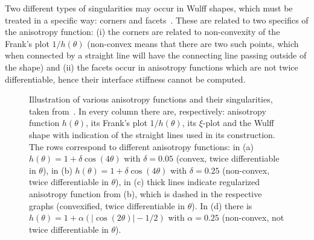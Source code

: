 Two different types of singularities may occur in Wulff shapes, which must be treated in a specific way: corners and facets~\cite{Kobayashi2001, Fleck2011}. These are related to two specifics of the anisotropy function: (i) the corners are related to non-convexity of the Frank's plot $1/h(\theta)$ (non-convex means that there are two such points, which when connected by a straight line will have the connecting line passing outside of the shape) and (ii) the facets occur in anisotropy functions which are not twice differentiable, hence their interface stiffness cannot be computed.
\begin{figure}
	\centering
	\caption[Various types of anisotropy functions in 2D]{Illustration of various anisotropy functions and their singularities, taken from~\cite{Kobayashi2001}. In every column there are, respectively: anisotropy function $h(\theta)$, its Frank's plot  $1/h(\theta)$, its $\xi$-plot and the Wulff shape with indication of the straight lines used in its construction. The rows correspond to different anisotropy functions: in (a) $h(\theta) = 1+\delta\cos(4\theta)$ with $\delta=0.05$ (convex, twice differentiable in $\theta$), in (b) $h(\theta) = 1+\delta\cos(4\theta)$ with $\delta=0.25$ (non-convex, twice differentiable in $\theta$), in (c) thick lines indicate regularized anisotropy function from (b), which is dashed in the respective graphs (convexified, twice differentiable in $\theta$). In (d) there is $h(\theta) = 1+\alpha(|\cos(2\theta)|-1/2)$ with $\alpha=0.25$ (non-convex, not twice differentiable in $\theta$).}
	\label{fig_types_anisofun}
\end{figure}


